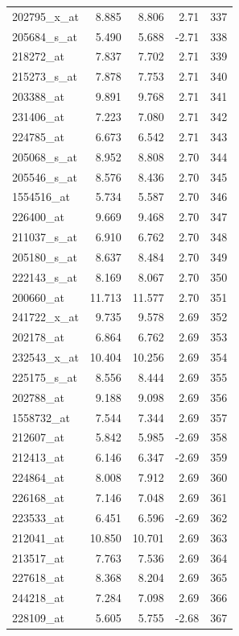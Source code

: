 \begin{footnotesize}
\begin{longtable}{lrrrr}
202795\_x\_at & 8.885 & 8.806 & 2.71 & 337 \\
205684\_s\_at & 5.490 & 5.688 & -2.71 & 338 \\
218272\_at & 7.837 & 7.702 & 2.71 & 339 \\
215273\_s\_at & 7.878 & 7.753 & 2.71 & 340 \\
203388\_at & 9.891 & 9.768 & 2.71 & 341 \\
231406\_at & 7.223 & 7.080 & 2.71 & 342 \\
224785\_at & 6.673 & 6.542 & 2.71 & 343 \\
205068\_s\_at & 8.952 & 8.808 & 2.70 & 344 \\
205546\_s\_at & 8.576 & 8.436 & 2.70 & 345 \\
1554516\_at & 5.734 & 5.587 & 2.70 & 346 \\
226400\_at & 9.669 & 9.468 & 2.70 & 347 \\
211037\_s\_at & 6.910 & 6.762 & 2.70 & 348 \\
205180\_s\_at & 8.637 & 8.484 & 2.70 & 349 \\
222143\_s\_at & 8.169 & 8.067 & 2.70 & 350 \\
200660\_at & 11.713 & 11.577 & 2.70 & 351 \\
241722\_x\_at & 9.735 & 9.578 & 2.69 & 352 \\
202178\_at & 6.864 & 6.762 & 2.69 & 353 \\
232543\_x\_at & 10.404 & 10.256 & 2.69 & 354 \\
225175\_s\_at & 8.556 & 8.444 & 2.69 & 355 \\
202788\_at & 9.188 & 9.098 & 2.69 & 356 \\
1558732\_at & 7.544 & 7.344 & 2.69 & 357 \\
212607\_at & 5.842 & 5.985 & -2.69 & 358 \\
212413\_at & 6.146 & 6.347 & -2.69 & 359 \\
224864\_at & 8.008 & 7.912 & 2.69 & 360 \\
226168\_at & 7.146 & 7.048 & 2.69 & 361 \\
223533\_at & 6.451 & 6.596 & -2.69 & 362 \\
212041\_at & 10.850 & 10.701 & 2.69 & 363 \\
213517\_at & 7.763 & 7.536 & 2.69 & 364 \\
227618\_at & 8.368 & 8.204 & 2.69 & 365 \\
244218\_at & 7.284 & 7.098 & 2.69 & 366 \\
228109\_at & 5.605 & 5.755 & -2.68 & 367 \\

\end{longtable}
\end{footnotesize}
